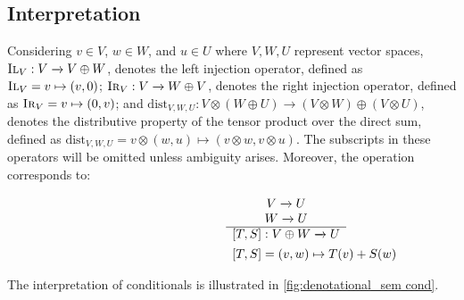 
\subsection{Interpretation}
Considering  $v \in V$, $w \in W$, and $u \in U$ where $V, W, U$ represent vector spaces, $\textsc{Il}_{V}: V \xrightarrow{} V\oplus W$, denotes the left injection operator, defined as $\textsc{Il}_{V}= v \mapsto (v,0) $; $\textsc{Ir}_{V}: V \xrightarrow{} W \oplus V$, denotes the right injection operator, defined as $\textsc{Ir}_{V}= v \mapsto (0,v) $; and $\text{dist}_{V, W,U}: V \otimes  \left(W \oplus U\right) \xrightarrow{} \left(V \otimes W\right) \oplus \left(V \otimes U\right)$, denotes the distributive property of the tensor product over the direct sum, defined as $\text{dist}_{V, W,U} =  v \otimes  \left(w, u\right) \mapsto \left(v \otimes w, v \otimes u\right)$. The subscripts in these operators will be omitted unless ambiguity arises. Moreover, the operation  corresponds to:
\begin{figure} [H]
\begin{equation}
\begin{split}
\begin{aligned}
\hspace{95pt}&
\begin{minipage}[t]{0.3\textwidth}
$\begin{array}{c}
     V  \xrightarrow{} U  \\
      W \xrightarrow{} U  \\
    \hline
  [T,S]: V \oplus W \xrightarrow{} U
\end{array}
$
\end{minipage} \\
\hspace{95pt}&
\begin{minipage}[t]{0.3\textwidth}
$\begin{array}{c}
  [T,S] = (v,w) \mapsto T(v)+S(w) 
\end{array}
$
\end{minipage}
\end{aligned}
\end{split}
\end{equation}
\label{fig:either}
\end{figure}

The interpretation of conditionals is illustrated in \autoref{fig:denotational_sem cond}.

